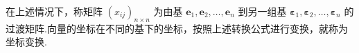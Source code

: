 \begin{definition}
  在上述情况下，称矩阵 $(x_{i j})_{n \times n}$ 为由基
  $\bm{e}_1, \bm{e}_2, \ldots, \bm{e}_n$ 到另一组基
  $\bm{\varepsilon}_1, \bm{\varepsilon}_2, \ldots,
  \bm{\varepsilon}_n$
  的过渡矩阵.向量的坐标在不同的基下的坐标，按照上述转换公式进行变换，就称为坐标变换.
\end{definition}



